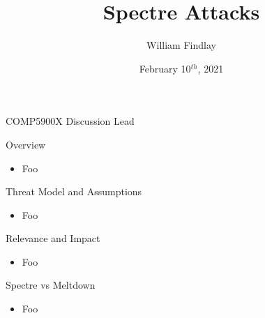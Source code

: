 \documentclass[12pt, dvipsnames, aspectratio=169]{beamer}
\date{February 10$^{th}$, 2021}
\title{Spectre Attacks}
\author{William Findlay}
\institute{Carleton University\\\href{mailto:will@ccsl.carleton.ca}{\ttfamily will@ccsl.carleton.ca}}
\begin{document}

\begin{frame}
  \titlepage
  \vfill
  \vspace{4em}
  {\footnotesize COMP5900X Discussion Lead}
\end{frame}

%

\begin{frame}[c]{Overview}
  \begin{itemize}
    \item Foo
  \end{itemize}
\end{frame}

\begin{frame}[c]{Threat Model and Assumptions}
  \begin{itemize}
    \item Foo
  \end{itemize}
\end{frame}

\begin{frame}[c]{Relevance and Impact}
  \begin{itemize}
    \item Foo
  \end{itemize}
\end{frame}

\begin{frame}[c]{Spectre vs Meltdown}
  \begin{itemize}
    \item Foo
  \end{itemize}
\end{frame}
\end{document}
